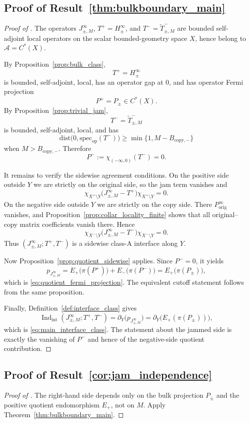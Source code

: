 \documentclass[11pt]{article}
\numberwithin{equation}{section}
\theoremstyle{definition}
\theoremstyle{remark}
\newcommand{\spec}{\mathrm{spec}}
\newcommand{\dist}{\mathrm{dist}}
\newcommand{\Indint}{\operatorname{Ind}_{\mathrm{int}}}
\begin{document}
\subsection{Proof of Result~\ref{thm:bulkboundary_main}}\label{app:proof:thm:bulkboundary_main}
\begin{proof}[Proof of ]
The operators $J_{\pm,M}^\infty$, $T^+=H_\pm^\infty$, and $T^-=\widetilde T^-_{\pm,M}$ are bounded
self-adjoint local operators on the scalar bounded-geometry space $X$, hence belong to
$\mathcal A=C^*(X)$.

By Proposition~\ref{prop:bulk_class},
\[
T^+=H_\pm^\infty
\]
is bounded, self-adjoint, local, has an operator gap at $0$, and has operator Fermi projection
\[
P^+=P_\pm\in C^*(X).
\]
By Proposition~\ref{prop:trivial_jam},
\[
T^-=\widetilde T^-_{\pm,M}
\]
is bounded, self-adjoint, local, and has
\[
\dist\bigl(0,\spec_{\mathrm{op}}(T^-)\bigr)\ge \min\{1,M-B_{\mathrm{copy},-}\}
\]
when $M>B_{\mathrm{copy},-}$. Therefore
\[
P^-:=\chi_{(-\infty,0)}(T^-)=0.
\]

It remains to verify the sidewise agreement conditions. On the positive side outside $Y$ we are
strictly on the original side, so the jam term vanishes and
\[
\chi_{X^+\setminus Y}\bigl(J_{\pm,M}^\infty-T^+\bigr)\chi_{X^+\setminus Y}=0.
\]
On the negative side outside $Y$ we are strictly on the copy side. There $P_{\mathrm{orig}}^\infty$
vanishes, and Proposition~\ref{prop:collar_locality_finite} shows that all original--copy matrix
coefficients vanish there. Hence
\[
\chi_{X^-\setminus Y}\bigl(J_{\pm,M}^\infty-T^-\bigr)\chi_{X^-\setminus Y}=0.
\]
Thus $(J_{\pm,M}^\infty;T^+,T^-)$ is a sidewise class-A interface along $Y$.

Now Proposition~\ref{prop:quotient_sidewise} applies. Since $P^-=0$, it yields
\[
p_{J_{\pm,M}^\infty}
=
E_+\!\bigl(\pi(P^+)\bigr)+E_-\!\bigl(\pi(P^-)\bigr)
=
E_+\!\bigl(\pi(P_\pm)\bigr),
\]
which is \eqref{eq:quotient_fermi_projection}. The equivalent cutoff statement follows from the
same proposition.

Finally, Definition~\ref{def:interface_class} gives
\[
\Indint(J_{\pm,M}^\infty;T^+,T^-)
=
\partial_Y\!\bigl(p_{J_{\pm,M}^\infty}\bigr)
=
\partial_Y\!\bigl(E_+(\pi(P_\pm))\bigr),
\]
which is \eqref{eq:main_interface_class}. The statement about the jammed side is exactly the
vanishing of $P^-$ and hence of the negative-side quotient contribution.
\end{proof}

\subsection{Proof of Result~\ref{cor:jam_independence}}\label{app:proof:cor:jam_independence}
\begin{proof}[Proof of ]
The right-hand side depends only on the bulk projection $P_\pm$ and the positive quotient
endomorphism $E_+$, not on $M$. Apply Theorem~\ref{thm:bulkboundary_main}.
\end{proof}
\end{document}
